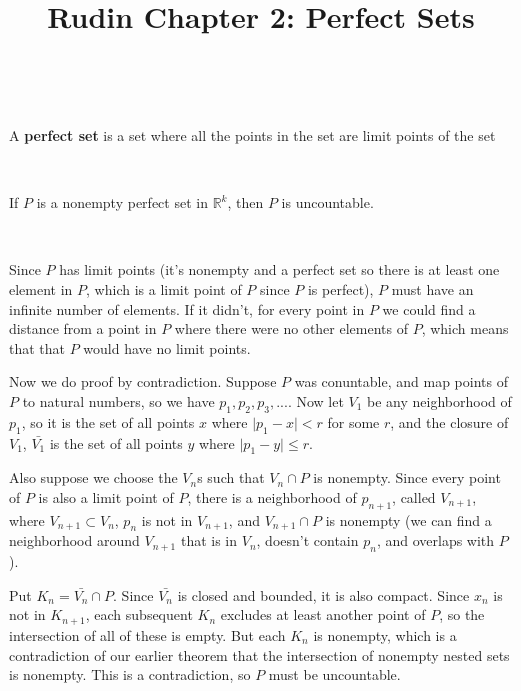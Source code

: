 \documentclass{article}
\title{Rudin Chapter 2: Perfect Sets}
\begin{document}
\maketitle


\begin{definition}
\

A \textbf{perfect set} is a set where all the points in the set are limit points of the set 
\end{definition}

\begin{theorem}
\

If $P$ is a nonempty perfect set in $\mathbb{R}^k$, then $P$ is uncountable.
\end{theorem}

\begin{customproof}
\

Since $P$ has limit points (it's nonempty and a perfect set so there is at least one element in $P$, which is a limit point of $P$ since $P$ is perfect), $P$ must have an infinite number of elements. If it didn't, for every point in $P$ we could find a distance from a point in $P$ where there were no other elements of $P$, which means that that $P$ would have no limit points.

Now we do proof by contradiction. Suppose $P$ was conuntable, and map points of $P$ to natural numbers, so we have $p_1, p_2, p_3, ... $. Now let $V_1$ be any neighborhood of $p_1$, so it is the set of all points $x$ where $\vert p_1 - x \vert < r$ for some $r$, and the closure of $V_1$, $\bar{V_1}$ is the set of all points $y$ where $\vert p_1 - y \vert \leq r$.

Also suppose we choose the $V_n$s such that $V_n \cap P$ is nonempty. Since every point of $P$ is also a limit point of $P$, there is a neighborhood of $p_{n+1}$, called $V_{n+1}$, where $V_{n+1} \subset V_n$, $p_n$ is not in $V_{n+1}$, and $V_{n+1} \cap P$ is nonempty (we can find a neighborhood around $V_{n+1}$ that is in $V_n$, doesn't contain $p_n$, and overlaps with $P$). 

Put $K_n = \bar{V_n} \cap P$. Since $\bar{V_n}$ is closed and bounded, it is also compact. Since $x_n$ is not in $K_{n+1}$, each subsequent $K_n$ excludes at least another point of $P$, so the intersection of all of these is empty. But each $K_n$ is nonempty, which is a contradiction of our earlier theorem that the intersection of nonempty nested sets is nonempty. This is a contradiction, so $P$ must be uncountable.
\end{customproof}
\end{document}
